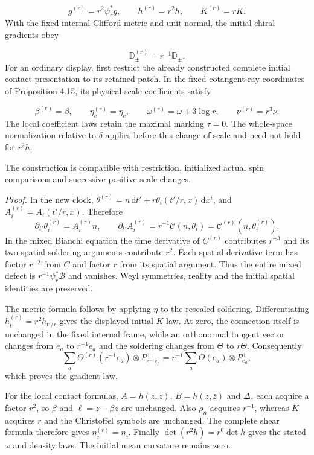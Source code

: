 \documentclass[
  english,
  11pt,
  reqno]{amsart}
\begin{document}
\label{eq:online-cartan-physical-scale-metric-data} \[
g^{(r)}=r^2\psi_r^*g,
\qquad
h^{(r)}=r^2h,
\qquad
K^{(r)}=rK.
\] With the fixed internal Clifford metric and unit normal, the initial
chiral gradients obey

\label{eq:online-cartan-physical-scale-gradients} \[
\mathbb D_\pm^{(r)}=r^{-1}\mathbb D_\pm.
\] For an ordinary display, first restrict the already constructed
complete initial contact presentation to its retained patch. In the
fixed cotangent-ray coordinates of
\hyperref[prop:online-contact-complete-kinematic-codec]{Proposition
4.15}, its physical-scale coefficients satisfy

\label{eq:online-cartan-physical-scale-contact} \[
\beta^{(r)}=\beta,\qquad
\eta_c^{(r)}=\eta_c,\qquad
\omega^{(r)}=\omega+3\log r,
\qquad
\nu^{(r)}=r^3\nu.
\] The local coefficient laws retain the maximal marking \(\tau=0\). The
whole-space normalization relative to \(\delta\) applies before this
change of scale and need not hold for \(r^2h\).

The construction is compatible with restriction, initialized actual spin
comparisons and successive positive scale changes.

\emph{Proof.} In the new clock,
\(\theta^{(r)}=n\,\mathrm dt'+r\theta_i(t'/r,x)\,\mathrm dx^i\), and
\(A_i^{(r)}=A_i(t'/r,x)\). Therefore \[
\partial_{t'}\theta_i^{(r)}=A_i^{(r)}n,
\qquad
\partial_{t'}A_i^{(r)}
=r^{-1}\mathcal C(n,\theta_i)
=\mathcal C^{(r)}(n,\theta_i^{(r)}).
\] In the mixed Bianchi equation the time derivative of \(C^{(r)}\)
contributes \(r^{-3}\) and its two spatial soldering arguments
contribute \(r^2\). Each spatial derivative term has factor \(r^{-2}\)
from \(C\) and factor \(r\) from its spatial argument. Thus the entire
mixed defect is \(r^{-1}\psi_r^*\mathcal B\) and vanishes. Weyl
symmetries, reality and the initial spatial identities are preserved.

The metric formula follows by applying \(\eta\) to the rescaled
soldering. Differentiating \(h^{(r)}_{t'}=r^2h_{t'/r}\) gives the
displayed initial \(K\) law. At zero, the connection itself is unchanged
in the fixed internal frame, while an orthonormal tangent vector changes
from \(e_a\) to \(r^{-1}e_a\) and the soldering changes from \(\Theta\)
to \(r\Theta\). Consequently \[
\sum_a\Theta^{(r)}(r^{-1}e_a)
\otimes P^\pm_{r^{-1}e_a}
=r^{-1}\sum_a\Theta(e_a)\otimes P^\pm_{e_a},
\] which proves the gradient law.

For the local contact formulas, \(A=h(z,z)\), \(B=h(z,\bar z)\) and
\(\Delta_c\) each acquire a factor \(r^2\), so \(\beta\) and
\(\ell=z-\beta\bar z\) are unchanged. Also \(\rho_n\) acquires
\(r^{-1}\), whereas \(K\) acquires \(r\) and the Christoffel symbols are
unchanged. The complete shear formula therefore gives
\(\eta_c^{(r)}=\eta_c\). Finally \(\det(r^2h)=r^6\det h\) gives the
stated \(\omega\) and density laws. The initial mean curvature remains
zero.
\end{document}
